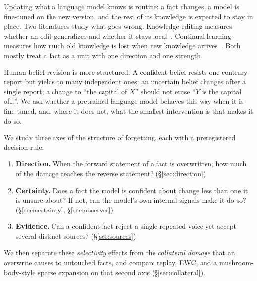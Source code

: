 \documentclass[11pt]{article}
\begin{document}
Updating what a language model knows is routine: a fact changes, a model is fine-tuned on the new version, and the rest of its knowledge is expected to stay in place.
Two literatures study what goes wrong.
Knowledge editing measures whether an edit generalizes and whether it stays local~\citep{meng2022locating,meng2023mass,cohen2024evaluating,yao2023editing}.
Continual learning measures how much old knowledge is lost when new knowledge arrives~\citep{mccloskey1989catastrophic,kirkpatrick2017overcoming,jang2022towards}.
Both mostly treat a fact as a unit with one direction and one strength.

Human belief revision is more structured.
A confident belief resists one contrary report but yields to many independent ones; an uncertain belief changes after a single report; a change to ``the capital of $X$'' should not erase ``$Y$ is the capital of\ldots''.
We ask whether a pretrained language model behaves this way when it is fine-tuned, and, where it does not, what the smallest intervention is that makes it do so.

We study three axes of the structure of forgetting, each with a preregistered decision rule:
\begin{enumerate}
  \item \textbf{Direction.} When the forward statement of a fact is overwritten, how much of the damage reaches the reverse statement? (\S\ref{sec:direction})
  \item \textbf{Certainty.} Does a fact the model is confident about change less than one it is unsure about? If not, can the model's own internal signals make it do so? (\S\ref{sec:certainty}, \S\ref{sec:observer})
  \item \textbf{Evidence.} Can a confident fact reject a single repeated voice yet accept several distinct sources? (\S\ref{sec:sources})
\end{enumerate}
We then separate these \emph{selectivity} effects from the \emph{collateral damage} that an overwrite causes to untouched facts, and compare replay, EWC, and a mushroom-body-style sparse expansion on that second axis (\S\ref{sec:collateral}).
\end{document}
